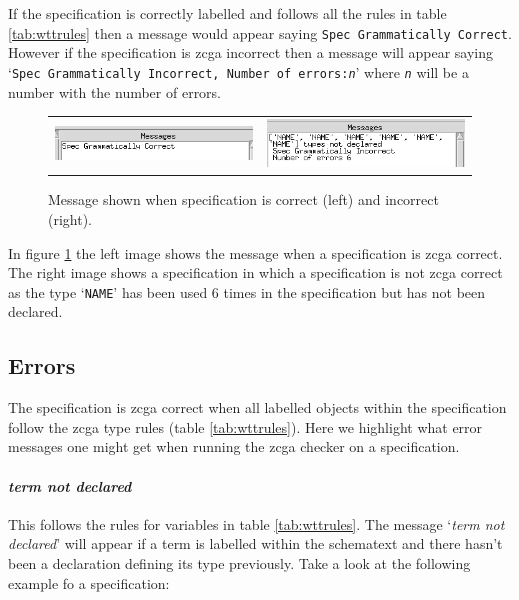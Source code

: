 If the specification is correctly labelled and follows all the rules in table \ref{tab:wttrules} then a message would appear saying \texttt{Spec Grammatically Correct}. However if the specification is \gls{zcga} incorrect then a message will appear saying `\texttt{Spec Grammatically Incorrect, Number of errors:\emph{n}}' where \texttt{\emph{n}} will be a number with the number of errors.

\begin{figure}[H]
\begin{tabular}{c c}
\includegraphics[scale=0.55]{Figures/zcga/zcgacorrect.png} 
& \includegraphics[scale=0.55]{Figures/zcga/zcgaincorrect.png}
\end{tabular}
\caption{Message shown when specification is correct (left) and incorrect (right).\label{fig:correctandincorrect}}
\end{figure}

In figure \ref{fig:correctandincorrect} the left image shows the message when a specification is \gls{zcga} correct. The right image shows a specification in which a specification is not \gls{zcga} correct as the type `\texttt{NAME}' has been used 6 times in the specification but has not been declared.

\subsection{Errors}
\label{subsec:zcgaerrors}

The specification is \gls{zcga} correct when all labelled objects within the specification follow the \gls{zcga} type rules (table \ref{tab:wttrules}). Here we highlight what error messages one might get when running the \gls{zcga} checker on a specification.


\paragraph{\emph{term not declared}}

This follows the rules for variables in table \ref{tab:wttrules}. The message `\emph{term not declared}' will appear if a term is labelled within the schematext and there hasn't been a declaration defining its type previously. Take a look at the following example fo a specification:


